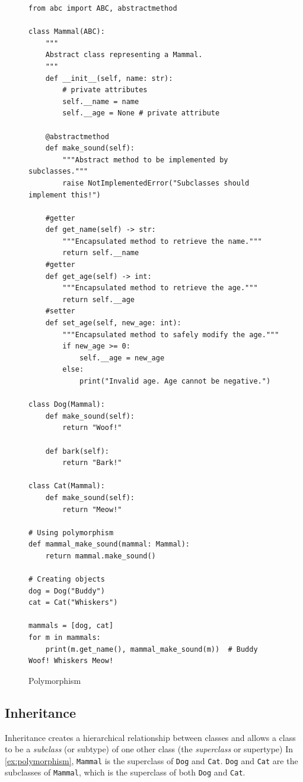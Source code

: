 \documentclass[oneside,11pt,dvipsnames]{book}
\newcommand{\code}[1]{\texttt{#1}}
\begin{document}
\begin{figure}
\begin{lstlisting}
from abc import ABC, abstractmethod

class Mammal(ABC):
    """
    Abstract class representing a Mammal.
    """
    def __init__(self, name: str): 
        # private attributes
        self.__name = name       
        self.__age = None # private attribute

    @abstractmethod
    def make_sound(self):
        """Abstract method to be implemented by subclasses."""
        raise NotImplementedError("Subclasses should implement this!")

    #getter 
    def get_name(self) -> str:
        """Encapsulated method to retrieve the name."""
        return self.__name
    #getter
    def get_age(self) -> int:
        """Encapsulated method to retrieve the age."""
        return self.__age
    #setter
    def set_age(self, new_age: int):
        """Encapsulated method to safely modify the age."""
        if new_age >= 0:
            self.__age = new_age
        else:
            print("Invalid age. Age cannot be negative.")

class Dog(Mammal):
    def make_sound(self):
        return "Woof!"

    def bark(self):
        return "Bark!"

class Cat(Mammal):
    def make_sound(self):
        return "Meow!"

# Using polymorphism
def mammal_make_sound(mammal: Mammal):
    return mammal.make_sound()

# Creating objects
dog = Dog("Buddy")
cat = Cat("Whiskers")

mammals = [dog, cat]
for m in mammals:
    print(m.get_name(), mammal_make_sound(m))  # Buddy Woof! Whiskers Meow!                                                 
\end{lstlisting}
\caption{Polymorphism}\label{ex:polymorphism}
\end{figure}

\subsection{Inheritance} 

Inheritance creates a hierarchical relationship between classes and allows a class to be a \emph{subclass} (or subtype) of one other class (the \emph{superclass} or supertype)
In \autoref{ex:polymorphism},
\code{Mammal} is the superclass of \code{Dog} and \code{Cat}.
\code{Dog} and \code{Cat} are the subclasses of \code{Mammal}, which is the superclass of both \code{Dog} and \code{Cat}.
\end{document}

